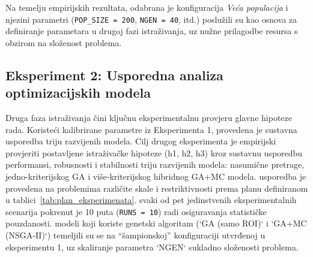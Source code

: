 Na temelju empirijskih rezultata, odabrana je konfiguracija \emph{Veća populacija} i njezini parametri (\texttt{POP\_SIZE = 200}, \texttt{NGEN = 40}, itd.) poslužili su kao osnova za definiranje parametara u drugoj fazi istraživanja, uz nužne prilagodbe resursa s obzirom na složenost problema.

\subsection{Eksperiment 2: Usporedna analiza optimizacijskih modela}
Druga faza istraživanja čini ključnu eksperimentalnu provjeru glavne hipoteze rada. Koristeći kalibrirane parametre iz Eksperimenta 1, provedena je sustavna usporedba triju razvijenih modela. Cilj drugog eksperimenta je empirijski provjeriti postavljene istraživačke hipoteze (h1, h2, h3) kroz sustavnu usporedbu performansi, robusnosti i stabilnosti triju razvijenih modela: nasumične pretrage, jedno-kriterijskog GA i više-kriterijskog hibridnog GA+MC modela. usporedba je provedena na problemima različite skale i restriktivnosti prema planu definiranom u tablici~\ref{tab:plan_eksperimenata}. svaki od pet jedinstvenih eksperimentalnih scenarija pokrenut je 10 puta (\texttt{RUNS = 10}) radi osiguravanja statističke pouzdanosti. modeli koji koriste genetski algoritam (`GA (samo ROI)` i `GA+MC (NSGA-II)`) temeljili su se na ``šampionskoj'' konfiguraciji utvrđenoj u eksperimentu 1, uz skaliranje parametra `NGEN` sukladno složenosti problema.

\begin{table}[H]
    \centering
    \caption{Plan naprednih eksperimenata.}
    \label{tab:plan_eksperimenata}
\end{table}

